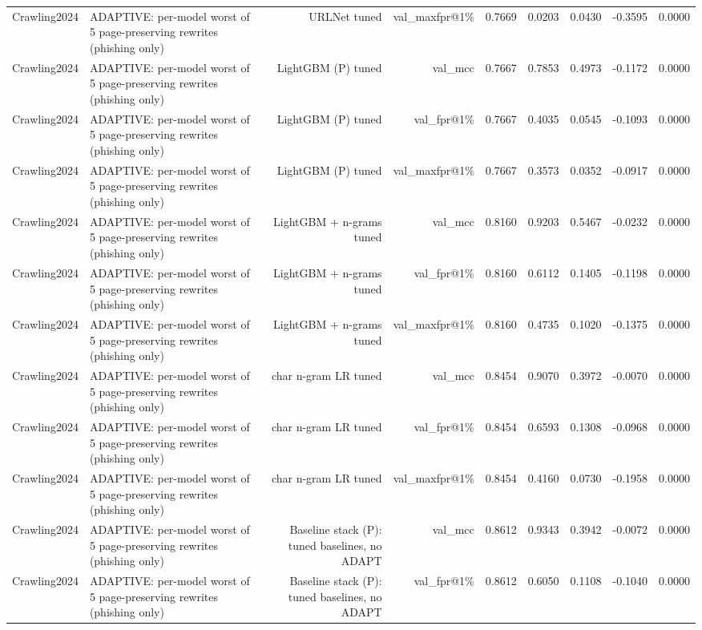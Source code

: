 \begin{table}[t]
\begin{tabular}{llrrrrrrr}
Crawling2024 & ADAPTIVE: per-model worst of 5 page-preserving rewrites (phishing only) & URLNet tuned & val\_maxfpr@1\% & 0.7669 & 0.0203 & 0.0430 & -0.3595 & 0.0000 \\
Crawling2024 & ADAPTIVE: per-model worst of 5 page-preserving rewrites (phishing only) & LightGBM (P) tuned & val\_mcc & 0.7667 & 0.7853 & 0.4973 & -0.1172 & 0.0000 \\
Crawling2024 & ADAPTIVE: per-model worst of 5 page-preserving rewrites (phishing only) & LightGBM (P) tuned & val\_fpr@1\% & 0.7667 & 0.4035 & 0.0545 & -0.1093 & 0.0000 \\
Crawling2024 & ADAPTIVE: per-model worst of 5 page-preserving rewrites (phishing only) & LightGBM (P) tuned & val\_maxfpr@1\% & 0.7667 & 0.3573 & 0.0352 & -0.0917 & 0.0000 \\
Crawling2024 & ADAPTIVE: per-model worst of 5 page-preserving rewrites (phishing only) & LightGBM + n-grams tuned & val\_mcc & 0.8160 & 0.9203 & 0.5467 & -0.0232 & 0.0000 \\
Crawling2024 & ADAPTIVE: per-model worst of 5 page-preserving rewrites (phishing only) & LightGBM + n-grams tuned & val\_fpr@1\% & 0.8160 & 0.6112 & 0.1405 & -0.1198 & 0.0000 \\
Crawling2024 & ADAPTIVE: per-model worst of 5 page-preserving rewrites (phishing only) & LightGBM + n-grams tuned & val\_maxfpr@1\% & 0.8160 & 0.4735 & 0.1020 & -0.1375 & 0.0000 \\
Crawling2024 & ADAPTIVE: per-model worst of 5 page-preserving rewrites (phishing only) & char n-gram LR tuned & val\_mcc & 0.8454 & 0.9070 & 0.3972 & -0.0070 & 0.0000 \\
Crawling2024 & ADAPTIVE: per-model worst of 5 page-preserving rewrites (phishing only) & char n-gram LR tuned & val\_fpr@1\% & 0.8454 & 0.6593 & 0.1308 & -0.0968 & 0.0000 \\
Crawling2024 & ADAPTIVE: per-model worst of 5 page-preserving rewrites (phishing only) & char n-gram LR tuned & val\_maxfpr@1\% & 0.8454 & 0.4160 & 0.0730 & -0.1958 & 0.0000 \\
Crawling2024 & ADAPTIVE: per-model worst of 5 page-preserving rewrites (phishing only) & Baseline stack (P): tuned baselines, no ADAPT & val\_mcc & 0.8612 & 0.9343 & 0.3942 & -0.0072 & 0.0000 \\
Crawling2024 & ADAPTIVE: per-model worst of 5 page-preserving rewrites (phishing only) & Baseline stack (P): tuned baselines, no ADAPT & val\_fpr@1\% & 0.8612 & 0.6050 & 0.1108 & -0.1040 & 0.0000 \\

\end{tabular}
\end{table}
